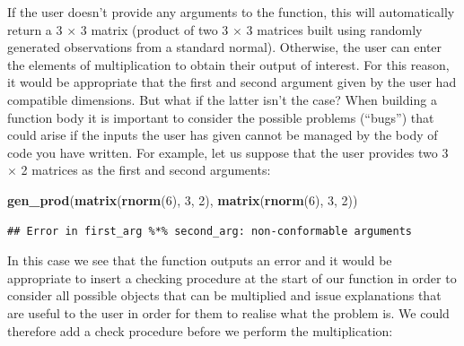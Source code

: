 \documentclass[12pt,]{krantz}
\newenvironment{Shaded}{\begin{snugshade}}{\end{snugshade}}
\newcommand{\KeywordTok}[1]{\textcolor[rgb]{0.27,0.27,0.27}{\textbf{#1}}}
\newcommand{\DataTypeTok}[1]{\textcolor[rgb]{0.27,0.27,0.27}{#1}}
\newcommand{\DecValTok}[1]{\textcolor[rgb]{0.06,0.06,0.06}{#1}}
\newcommand{\StringTok}[1]{\textcolor[rgb]{0.5,0.5,0.5}{#1}}
\newcommand{\ControlFlowTok}[1]{\textcolor[rgb]{0.27,0.27,0.27}{\textbf{#1}}}
\newcommand{\OperatorTok}[1]{\textcolor[rgb]{0.43,0.43,0.43}{\textbf{#1}}}
\newcommand{\NormalTok}[1]{#1}
\begin{document}
If the user doesn't provide any arguments to the function, this will
automatically return a 3 \(\times\) 3 matrix (product of two 3
\(\times\) 3 matrices built using randomly generated observations from a
standard normal). Otherwise, the user can enter the elements of
multiplication to obtain their output of interest. For this reason, it
would be appropriate that the first and second argument given by the
user had compatible dimensions. But what if the latter isn't the case?
When building a function body it is important to consider the possible
problems (``bugs'') that could arise if the inputs the user has given
cannot be managed by the body of code you have written. For example, let
us suppose that the user provides two 3 \(\times\) 2 matrices as the
first and second arguments:

\begin{Shaded}
\begin{Highlighting}[]
\KeywordTok{gen_prod}\NormalTok{(}\KeywordTok{matrix}\NormalTok{(}\KeywordTok{rnorm}\NormalTok{(}\DecValTok{6}\NormalTok{), }\DecValTok{3}\NormalTok{, }\DecValTok{2}\NormalTok{), }\KeywordTok{matrix}\NormalTok{(}\KeywordTok{rnorm}\NormalTok{(}\DecValTok{6}\NormalTok{), }\DecValTok{3}\NormalTok{, }\DecValTok{2}\NormalTok{))}
\end{Highlighting}
\end{Shaded}

\begin{verbatim}
## Error in first_arg %*% second_arg: non-conformable arguments
\end{verbatim}

In this case we see that the function outputs an error and it would be
appropriate to insert a checking procedure at the start of our function
in order to consider all possible objects that can be multiplied and
issue explanations that are useful to the user in order for them to
realise what the problem is. We could therefore add a check procedure
before we perform the multiplication:

\begin{Shaded}
\end{Shaded}
\end{document}
